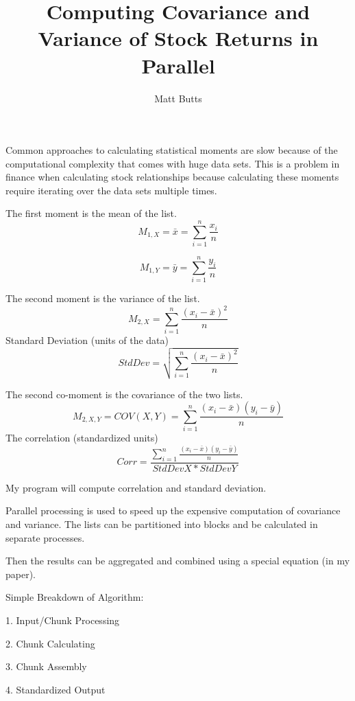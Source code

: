 \documentclass{beamer}
\title{Computing Covariance and Variance of Stock Returns in Parallel}
\author{Matt Butts}\institute{University of Washington}
\begin{document}
\begin{frame}
\titlepage
\end{frame}

\begin{frame}
Common approaches to calculating statistical moments are slow because of the computational complexity that comes with huge data sets. This is a problem in finance when calculating stock relationships because calculating these moments require iterating over the data sets multiple times.
\end{frame}

\begin{frame}
The first moment is the mean of the list.
$$M_{1, X} = \bar{x} = \sum\limits_{i=1}^n \frac{x_i}{n}$$

$$M_{1, Y} = \bar{y} = \sum\limits_{i=1}^n \frac{y_i}{n}$$
\end{frame}

\begin{frame}
The second moment is the variance of the list.
$$M_{2, X} = \sum\limits_{i=1}^n \frac{(x_i - \bar{x})^2}{n}$$
Standard Deviation (units of the data)
$$StdDev = \sqrt{\sum\limits_{i=1}^n \frac{(x_i - \bar{x})^2}{n}}$$
\end{frame}

\begin{frame}
The second co-moment is the covariance of the two lists.
$$M_{2, X, Y} = COV(X,Y) = \sum\limits_{i=1}^n \frac{(x_i - \bar{x})(y_i - \bar{y})}{n}$$
The correlation (standardized units)
$$Corr = \frac{\sum\limits_{i=1}^n \frac{(x_i - \bar{x})(y_i - \bar{y})}{n}}{StdDevX * StdDevY}$$
\end{frame}

\begin{frame}
\textbullet My program will compute correlation and standard deviation.

\textbullet Parallel processing is used to speed up the expensive computation of covariance and variance. The lists can be partitioned into blocks and be calculated in separate processes. 

\textbullet Then the results can be aggregated and combined using a special equation (in my paper).
\end{frame}

\begin{frame}
Simple Breakdown of Algorithm:

1. Input/Chunk Processing

2. Chunk Calculating

3. Chunk Assembly

4. Standardized Output
\end{frame}
\end{document}
